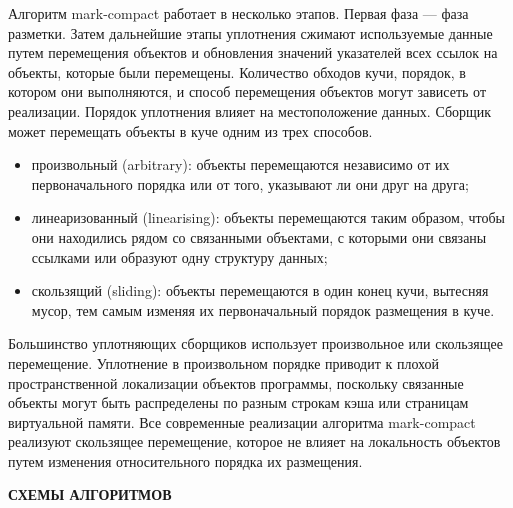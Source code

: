 Алгоритм mark-compact работает в несколько этапов. Первая фаза --- фаза разметки. Затем дальнейшие
этапы уплотнения сжимают используемые данные путем перемещения объектов и обновления значений указателей всех ссылок на объекты, которые были перемещены. Количество обходов кучи, порядок, в котором они выполняются, и способ перемещения объектов могут зависеть от реализации. Порядок уплотнения влияет на местоположение данных. Сборщик может перемещать объекты в куче одним из трех способов. \cite{handbook}

\begin{itemize}[label*=---]
	\item произвольный (arbitrary): объекты перемещаются независимо от их первоначального порядка или от того, указывают ли они друг на друга;
	\item линеаризованный (linearising): объекты перемещаются таким образом, чтобы они находились рядом со связанными объектами, с которыми они связаны ссылками или образуют одну структуру данных;
	\item скользящий (sliding): объекты перемещаются в один конец кучи, вытесняя мусор, тем самым изменяя их первоначальный порядок размещения в куче.
\end{itemize}

Большинство уплотняющих сборщиков использует произвольное или скользящее перемещение. Уплотнение в произвольном порядке приводит к плохой пространственной локализации объектов программы, поскольку связанные объекты могут быть распределены по разным строкам кэша или страницам виртуальной памяти. Все современные реализации алгоритма mark-compact реализуют скользящее перемещение, которое не влияет на локальность объектов путем изменения относительного порядка их размещения.  \cite{handbook}

\textbf{СХЕМЫ АЛГОРИТМОВ}

